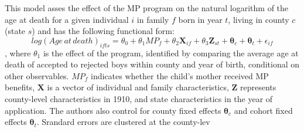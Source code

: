 This model asses the effect of the MP program on the natural logarithm of the age at death for a given individual $i$ in family $f$ born in year $t$, living in county $c$ (state $s$) and has the following functional form:
$$
log(Age\,at\,death)_{ifts} = \theta_0 + \theta_1MP_f + \theta_2\mathbf{X}_{if} + \theta_3\mathbf{Z}_{st} + \mathbf{\theta}_c + \mathbf{\theta}_t + \epsilon_{if}
$$
, where $\theta_1$ is the effect of the program, identified by comparing the average age at death of accepted to rejected boys within county and year of birth, conditional on other observables. $MP_f$ indicates whether the child's mother received MP benefits, $\mathbf{X}$ is a vector of individual and family characteristics, $\mathbf{Z}$ represents county-level characteristics in 1910, and state characteristics in the year of application. The authors also control for county fixed effects $\mathbf{\theta}_c$ and cohort fixed effects $\mathbf{\theta}_t$. Srandard errors are clustered at the county-lev
